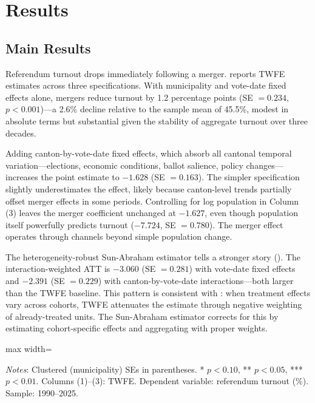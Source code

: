 \documentclass[12pt]{article}
\begin{document}
\section{Results}

\subsection{Main Results}

Referendum turnout drops immediately following a merger.  reports TWFE estimates across three specifications. With municipality and vote-date fixed effects alone, mergers reduce turnout by 1.2 percentage points (SE $= 0.234$, $p < 0.001$)---a 2.6\% decline relative to the sample mean of 45.5\%, modest in absolute terms but substantial given the stability of aggregate turnout over three decades.

Adding canton-by-vote-date fixed effects, which absorb all cantonal temporal variation---elections, economic conditions, ballot salience, policy changes---increases the point estimate to $-1.628$ (SE $= 0.163$). The simpler specification slightly underestimates the effect, likely because canton-level trends partially offset merger effects in some periods. Controlling for log population in Column (3) leaves the merger coefficient unchanged at $-1.627$, even though population itself powerfully predicts turnout ($-7.724$, SE $= 0.780$). The merger effect operates through channels beyond simple population change.

The heterogeneity-robust Sun-Abraham estimator tells a stronger story (). The interaction-weighted ATT is $-3.060$ (SE $= 0.281$) with vote-date fixed effects and $-2.391$ (SE $= 0.229$) with canton-by-vote-date interactions---both larger than the TWFE baseline. This pattern is consistent with \citet{goodmanbacon2021difference}: when treatment effects vary across cohorts, TWFE attenuates the estimate through negative weighting of already-treated units. The Sun-Abraham estimator corrects for this by estimating cohort-specific effects and aggregating with proper weights.

\begin{table}[H]
\centering
\caption{Effect of Municipal Mergers on Referendum Turnout}
\label{tab:main}
\begin{adjustbox}{max width=\textwidth}

\end{adjustbox}
\vspace{0.3em}
\parbox{\textwidth}{\footnotesize \textit{Notes}: Clustered (municipality) SEs in parentheses. * $p<0.10$, ** $p<0.05$, *** $p<0.01$. Columns (1)--(3): TWFE. Dependent variable: referendum turnout (\%). Sample: 1990--2025.}
\end{table}
\end{document}
